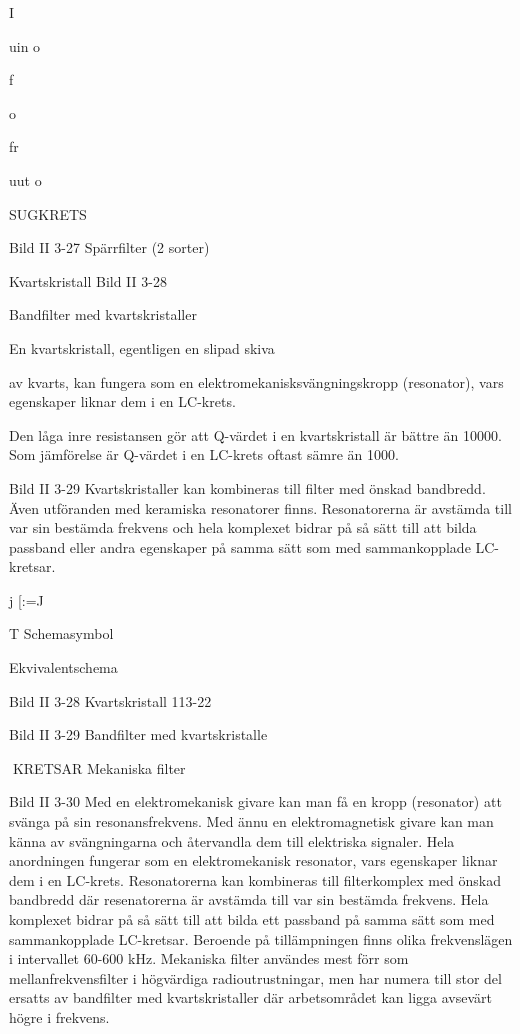 {{{I

uin
o

f

o

fr

uut
o

SUGKRETS

Bild II 3-27 Spärrfilter (2 sorter)

Kvartskristall
Bild II 3-28

Bandfilter med kvartskristaller

En kvartskristall, egentligen en slipad skiva

av kvarts, kan fungera som en elektromekanisksvängningskropp (resonator), vars egenskaper liknar dem i en LC-krets.

Den låga inre resistansen gör att Q-värdet i en kvartskristall är bättre än 10000.
Som jämförelse är Q-värdet i en LC-krets
oftast sämre än 1000.

Bild II 3-29
Kvartskristaller kan kombineras till filter med
önskad bandbredd. Även utföranden med
keramiska resonatorer finns.
Resonatorerna är avstämda till var sin
bestämda frekvens och hela komplexet bidrar på så sätt till att bilda passband eller
andra egenskaper på samma sätt som med
sammankopplade LC-kretsar.

j
[:=J

T
Schemasymbol

Ekvivalentschema

Bild II 3-28 Kvartskristall
113-22

Bild II 3-29 Bandfilter med kvartskristalle

KRETSAR
Mekaniska filter

Bild II 3-30
Med en elektromekanisk givare kan man få
en kropp (resonator) att svänga på sin resonansfrekvens. Med ännu en elektromagnetisk givare kan man känna av svängningarna och återvandla dem till elektriska signaler. Hela anordningen fungerar som en elektromekanisk resonator, vars egenskaper liknar dem i en LC-krets.
Resonatorerna kan kombineras till filterkomplex med önskad bandbredd där resenatorerna är avstämda till var sin bestämda frekvens. Hela komplexet bidrar på så
sätt till att bilda ett passband på samma sätt
som med sammankopplade LC-kretsar.
Beroende på tillämpningen finns olika frekvenslägen i intervallet 60-600 kHz.
Mekaniska filter användes mest förr som
mellanfrekvensfilter i högvärdiga radioutrustningar, men har numera till stor del ersatts
av bandfilter med kvartskristaller där arbetsområdet kan ligga avsevärt högre i frekvens.

}}}
